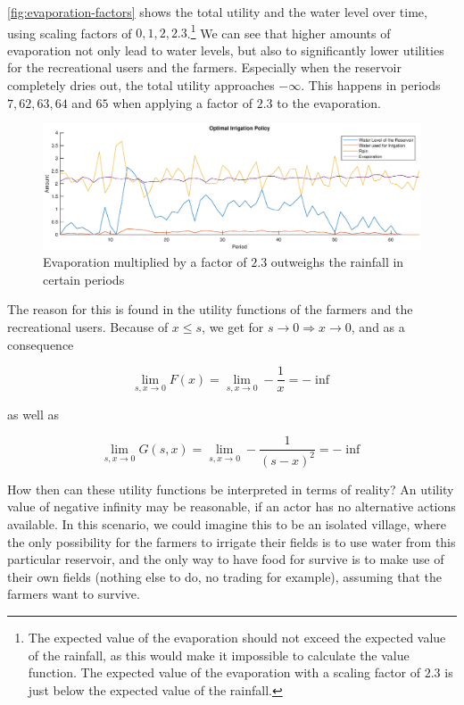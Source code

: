 \documentclass[12pt, a4paper, oneside]{article}
\begin{document}
\ref{fig:evaporation-factors} shows the total utility and the water level over time, using scaling factors of $0, 1, 2, 2.3$.\footnote{The expected value of the evaporation should not exceed the expected value of the rainfall, as this would make it impossible to calculate the value function. The expected value of the evaporation with a scaling factor of $2.3$ is just below the expected value of the rainfall. } %
We can see that higher amounts of evaporation not only lead to water levels, but also to significantly lower utilities for the recreational users and the farmers. 
Especially when the reservoir completely dries out, the total utility approaches $-\infty$. This happens in periods $7,62,63,64$ and $65$ when applying a factor of $2.3$ to the evaporation. 

\begin{figure}[h]
	\includegraphics[width=1\textwidth]{figures/results-evap-factor-2-3.eps}
	\caption{Evaporation multiplied by a factor of $2.3$ outweighs the rainfall in certain periods} %
	\label{fig:evap-factor-2.3}
\end{figure}

The reason for this is found in the utility functions of the farmers and the recreational users. Because of $x\leq s$, we get for $s\to 0 \Rightarrow x\to 0$, and as a consequence 

\begin{equation}
\lim_{s, x\to0}F(x) = \lim_{s,x\to0}-\frac{1}{x} = -\inf
\end{equation}

as well as

\begin{equation}
\lim_{s, x\to0}G(s,x) = \lim_{s,x\to0}-\frac{1}{(s-x)^2} = -\inf
\end{equation}




How then can these utility functions be interpreted in terms of reality? 
An utility value of negative infinity may be reasonable, if an actor has no alternative actions available. 
In this scenario, we could imagine this to be an isolated village, where the only possibility for the farmers to irrigate their fields is to use water from this particular reservoir, and the only way to have food for survive is to make use of their own fields (nothing else to do, no trading for example), assuming that the farmers want to survive. 
\end{document}
